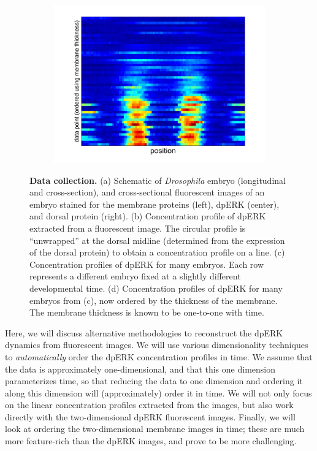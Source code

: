 \documentclass[10pt]{article}
\begin{document}
\begin{figure}[!ht]
\begin{center}
\begin{subfigure}{0.4\textwidth}
\includegraphics[width=\textwidth]{data_ordered_membrane}
\caption{}
\end{subfigure}
\end{center}
\caption{{\bf Data collection.} (a) Schematic of {\em Drosophila} embryo (longitudinal and cross-section), and cross-sectional fluorescent images of an embryo stained for the membrane proteins (left), dpERK (center), and dorsal protein (right).
(b) Concentration profile of dpERK extracted from a fluorescent image. The circular profile is ``unwrapped'' at the dorsal midline (determined from the expression of the dorsal protein) to obtain a concentration profile on a line.
(c) Concentration profiles of dpERK for many embryos. Each row represents a different embryo fixed at a slightly different developmental time.
(d) Concentration profiles of dpERK for many embryos from (c), now ordered by the thickness of the membrane. The membrane thickness is known to be one-to-one with time.}
\label{fig:background}
\end{figure}

Here,  we will discuss alternative methodologies to reconstruct the dpERK dynamics from fluorescent images. 
%
We will use various dimensionality techniques to {\em automatically} order the dpERK concentration profiles in time.
%
We assume that the data is approximately one-dimensional, and that this one dimension parameterizes time, so that reducing the data to one dimension and ordering it along this dimension will (approximately) order it in time. 
%
We will not only focus on the linear concentration profiles extracted from the images, but also work directly with the two-dimensional dpERK fluorescent images. 
%
Finally, we will look at ordering the two-dimensional membrane images in time; these are much more feature-rich than the dpERK images, and prove to be more challenging.
\end{document}
